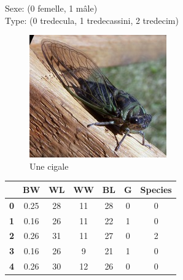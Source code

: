 \documentclass[final]{beamer}
\newlength{\sepwid}
\newlength{\onecolwid}
\newlength{\twocolwid}
\begin{document}
\begin{frame}[t]
\begin{columns}[t]
\begin{column}{\onecolwid}
\small
Sexe: (0 femelle, 1 mâle)\\
Type: (0 tredecula, 1 tredecassini, 2 tredecim)
\normalsize



\begin{figure}
\includegraphics[width=0.8\linewidth]{cicada.jpg}
\caption{Une cigale}
\end{figure}


\begin{table}[]
\begin{tabular}{lcccccc}
&BW&WL&WW&BL&G&Species\\\hline
\textbf{0}&0.25&28&11&28&0&0\\
\textbf{1}&0.16&26&11&22&1&0\\
\textbf{2}&0.26&31&11&27&0&2\\
\textbf{3}&0.16&26&9&21&1&0\\
\textbf{4}&0.26&30&12&26&0&0
\end{tabular}
\end{table}

\end{column} %

\begin{column}{\sepwid}\end{column} %

\begin{column}{\twocolwid} %


\end{column}
\end{columns}
\end{frame}
\end{document}
